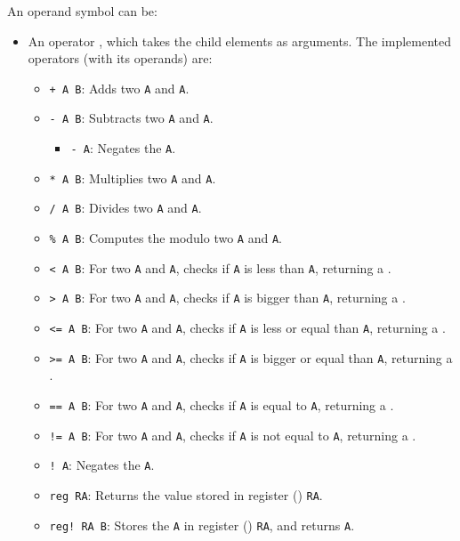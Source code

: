 \noindent
An operand symbol can be:
\begin{itemize}
  \item An operator , which takes the child elements as arguments. The implemented operators (with its operands) are:
  \begin{itemize}
    \item \texttt{+ A B}: Adds two  \texttt{A} and \texttt{A}.
    \item \texttt{- A B}: Subtracts two  \texttt{A} and \texttt{A}.
    \begin{itemize}
      \item \texttt{- A}: Negates the  \texttt{A}.
    \end{itemize}
    \item \texttt{* A B}: Multiplies two  \texttt{A} and \texttt{A}.
    \item \texttt{/ A B}: Divides two  \texttt{A} and \texttt{A}.
    \item \texttt{\% A B}: Computes the modulo two  \texttt{A} and \texttt{A}.
    \item \texttt{< A B}: For two  \texttt{A} and \texttt{A}, checks if \texttt{A} is less than \texttt{A}, returning a .
    \item \texttt{> A B}: For two  \texttt{A} and \texttt{A}, checks if \texttt{A} is bigger than \texttt{A}, returning a .
    \item \texttt{<= A B}: For two  \texttt{A} and \texttt{A}, checks if \texttt{A} is less or equal than \texttt{A}, returning a .
    \item \texttt{>= A B}: For two  \texttt{A} and \texttt{A}, checks if \texttt{A} is bigger or equal than \texttt{A}, returning a .
    \item \texttt{== A B}: For two  \texttt{A} and \texttt{A}, checks if \texttt{A} is equal to \texttt{A}, returning a .
    \item \texttt{!= A B}: For two  \texttt{A} and \texttt{A}, checks if \texttt{A} is not equal to \texttt{A}, returning a .
    \item \texttt{!\ A}: Negates the  \texttt{A}.
    \item \texttt{reg RA}: Returns the value stored in register () \texttt{RA}.
    \item \texttt{reg!\ RA B}: Stores the  \texttt{A} in register () \texttt{RA}, and returns \texttt{A}.

\end{itemize}
\end{itemize}
